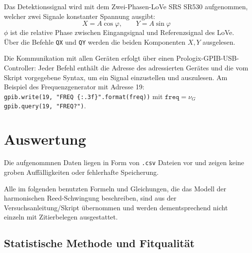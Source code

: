 \documentclass[11pt,a4paper]{article}
\begin{document}
Das Detektionssignal wird mit dem Zwei-Phasen-LoVe SRS SR530 aufgenommen, welcher zwei Signale konstanter Spannung ausgibt: 
\begin{equation}
    X=A\cos\varphi,
    \qquad
    Y=A\sin\varphi
\end{equation}
\(\phi\) ist die relative Phase zwischen Eingangsignal und Referenzsignal des LoVe. Über die Befehle \texttt{QX} und \texttt{QY} werden die beiden Komponenten \(X,Y\) ausgelesen.

Die Kommunikation mit allen Geräten erfolgt über einen Prologix-GPIB-USB-Controller: Jeder Befehl enthält die Adresse des adressierten Gerätes und die vom Skript vorgegebene Syntax, um ein Signal einzustellen und auszulesen. Am Beispiel des Frequenzgenerator mit Adresse 19:\\
\verb|gpib.write(19, "FREQ {:.3f}".format(freq))| mit \(\texttt{freq}=\nu_G\)\\
\verb|gpib.query(19, "FREQ?")|.

\section{Auswertung}
Die aufgenommnen Daten liegen in Form von \verb|.csv| Dateien vor und zeigen keine groben Auffälligkeiten oder fehlerhafte Speicherung. 

Alle im folgenden benutzten Formeln und Gleichungen, die das Modell der harmonischen Reed-Schwingung beschreiben, sind aus der Versuchsanleitung/Skript \autocite{Skript} übernommen und werden dementsprechend nicht einzeln mit Zitierbelegen ausgestattet. 

\subsection{Statistische Methode und Fitqualität}
\end{document}
